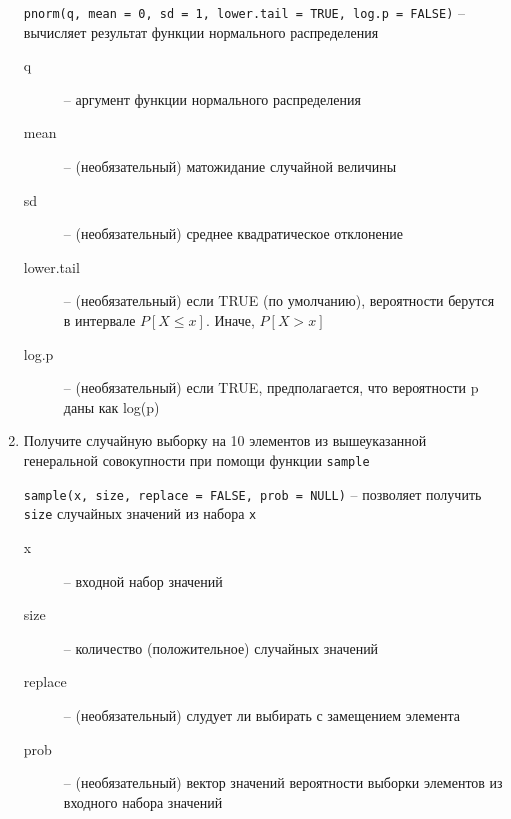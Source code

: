 \begin{enumerate}
\begin{mdframed}[style=BadassFrame]
              \texttt{pnorm(q, mean = 0, sd = 1, lower.tail = TRUE, log.p = FALSE)} 
                -- вычисляет результат функции нормального распределения
              \begin{description}

                \item[q] -- аргумент функции нормального распределения
                \item[mean] -- (необязательный) матожидание случайной величины
                \item[sd] -- (необязательный) среднее квадратическое отклонение
                \item[lower.tail] -- (необязательный) если TRUE (по умолчанию), вероятности берутся в интервале $P[X \leq x]$. Иначе, $P[X > x]$ 
                \item[log.p] -- (необязательный) если TRUE, предполагается, что вероятности p даны как log(p)
              \end{description}
          \end{mdframed}

    \item Получите случайную выборку на 10 элементов из вышеуказанной генеральной совокупности при помощи функции
          \texttt{sample}

          \begin{mdframed}[style=BadassFrame]

              \texttt{sample(x, size, replace = FALSE, prob = NULL)} 
                -- позволяет получить \texttt{size} случайных значений из набора \texttt{x}
              \begin{description}

                \item[x] -- входной набор значений
                \item[size] -- количество (положительное) случайных значений
                \item[replace] -- (необязательный) слудует ли выбирать с замещением элемента
                \item[prob] -- (необязательный) вектор значений вероятности выборки элементов из входного набора значений
              \end{description}
          \end{mdframed}


\end{enumerate}



